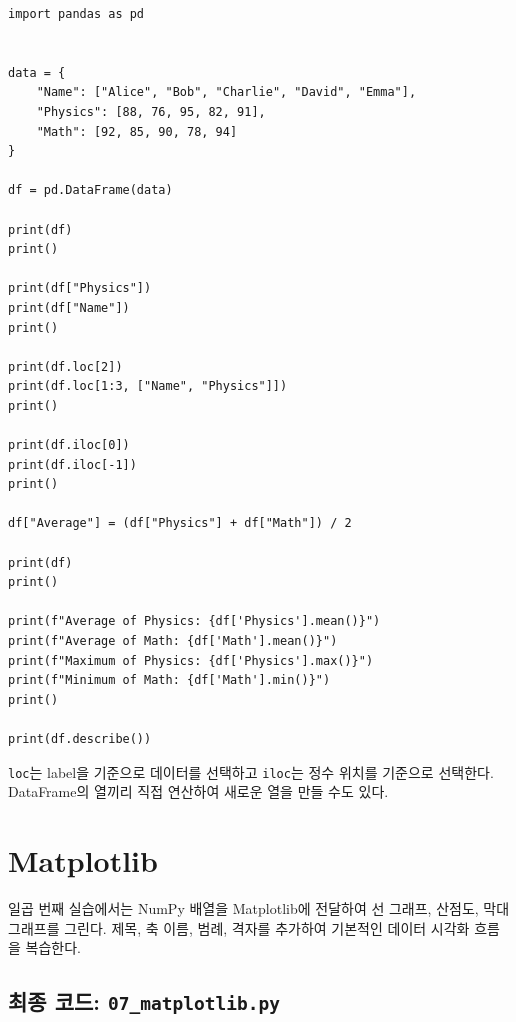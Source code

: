 \documentclass[11pt,a4paper]{article}
\begin{document}
\begin{lstlisting}
import pandas as pd


data = {
    "Name": ["Alice", "Bob", "Charlie", "David", "Emma"],
    "Physics": [88, 76, 95, 82, 91],
    "Math": [92, 85, 90, 78, 94]
}

df = pd.DataFrame(data)

print(df)
print()

print(df["Physics"])
print(df["Name"])
print()

print(df.loc[2])
print(df.loc[1:3, ["Name", "Physics"]])
print()

print(df.iloc[0])
print(df.iloc[-1])
print()

df["Average"] = (df["Physics"] + df["Math"]) / 2

print(df)
print()

print(f"Average of Physics: {df['Physics'].mean()}")
print(f"Average of Math: {df['Math'].mean()}")
print(f"Maximum of Physics: {df['Physics'].max()}")
print(f"Minimum of Math: {df['Math'].min()}")
print()

print(df.describe())
\end{lstlisting}

\begin{importantbox}
\texttt{loc}는 label을 기준으로 데이터를 선택하고 \texttt{iloc}는 정수 위치를 기준으로 선택한다.
DataFrame의 열끼리 직접 연산하여 새로운 열을 만들 수도 있다.
\end{importantbox}

\section{Matplotlib}

일곱 번째 실습에서는 NumPy 배열을 Matplotlib에 전달하여 선 그래프, 산점도, 막대그래프를 그린다.
제목, 축 이름, 범례, 격자를 추가하여 기본적인 데이터 시각화 흐름을 복습한다.

\subsection{최종 코드: \texttt{07\_matplotlib.py}}
\end{document}
